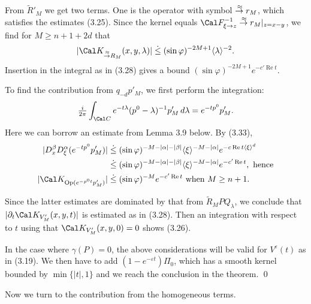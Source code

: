 From $\tilde R'_M$ we get two terms. One is the operator with symbol
$\overset{\,\approx}\to r_M$, which satisfies the estimates (3.25). Since the kernel
equals $\Cal F^{-1}_{\xi \to z}\ttilde r_M|_{z=x-y}$, we find for
$M\ge n+1+2d$ that
$$
|\Cal K_{\ttilde R_M}(x,y,\lambda )|\leg (\sin\varphi )^{-2M+1}\ang\lambda ^{-2}.
$$
Insertion in the integral as in (3.28) gives a bound $(\sin\varphi
)^{-2M+1}e^{-c'\operatorname{Re}t}$.


To find the contribution from  $q_{-d}p'_M$, we first perform the integration:
$$
\tfrac i {2\pi }\int_{\Cal C}e^{-t\lambda
}(p^0-\lambda )^{-1} p'_M\,d\lambda
=e^{-tp^0}p'_M.
$$
Here we can borrow an estimate from Lemma 3.9 below. By (3.33),
$$
\aligned
|D_x^\beta D_\xi ^\alpha (e^{-tp^0}p'_M)|&\leg (\sin \varphi)^{-M
-|\alpha|-|\beta|}
\ang\xi ^{-M-|\alpha|}e^{-c\operatorname{Re}t \ang \xi ^d}\\
&\leg (\sin \varphi)^{-M
-|\alpha|-|\beta|}
\ang\xi ^{-M-|\alpha|}e^{-c'\operatorname{Re}t }, \text{ hence}\\
|\Cal K_{\Op(e^{-p^0t}p'_M)}|&\leg(\sin \varphi)^{-M
}e^{-c'\operatorname{Re}t}\text{ when }M\ge n+1
.\endaligned
$$


Since the latter estimates are dominated
by that from $\widetilde R_MPQ_\lambda $, we conclude
that
$|\partial_t\Cal K_{V'_M}(x,y,t)|$ is estimated as in (3.28). Then an
integration with respect to $t$ using that $\Cal K_{V'_M}(x,y,0)=0$
shows (3.26).

In the case where $\gamma (P)=0$, the above considerations will be
valid for $V^\varepsilon (t)$ as in (3.19). We then have to add
$(1-e^{-\varepsilon t})\Pi _0$, which has a smooth kernel bounded by
$\operatorname{min} \{|t|, 1\}$
and we reach the conclusion in the theorem.
\qed
\enddemo

Now we turn to the contribution from the homogeneous terms.

